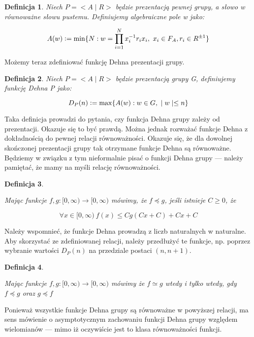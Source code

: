 \documentclass[licencjacka]{pracamgr}
\newcommand{\defeq}{\vcentcolon=}
\newtheorem{defi}{Definicja}[section]
\begin{document}
\begin{defi}\label{Algebraic area}
Niech $P = <A \mid R>$ będzie prezentacją pewnej grupy, a słowo w równoważne słowu pustemu. Definiujemy algebraiczne pole w jako:

\[ A(w) \defeq \min \{ N : w = \prod_{i=1}^{N} x_{i}^{-1}r_{i}x_{i}, \  x_{i} \in F_{A}, r_{i} \in R^{\pm 1} \} \]

\end{defi}

Możemy teraz zdefiniować funkcję Dehna prezentacji grupy.

\begin{defi}\label{Dehn function}
Niech $P = <A \mid R>$ będzie prezentacją grupy G, definiujemy funkcję Dehna P jako:

\[ D_{P}(n) \defeq \max \{ A(w) : w \in G, \ \mid w \mid \leq n \} \]

\end{defi}

Taka definicja prowadzi do pytania, czy funkcja Dehna grupy zależy od prezentacji. Okazuje się to być prawdą. Można jednak rozważać funkcje Dehna z dokładnością do pewnej relacji równoważności. Okazuje się, że dla dowolnej skończonej prezentacji grupy tak otrzymane funkcje Dehna są równoważne. Będziemy w związku z tym nieformalnie pisać o funkcji Dehna grupy — należy pamiętać, że mamy na myśli relację równoważności.

\begin{defi}\label{order relation}

Mając funkcje $f, g : [0, \infty) \rightarrow [0, \infty) $ mówimy, że $f \preceq g$, jeśli istnieje $C \ge 0$, że

\[ \forall x \in [0, \infty) \  f(x) \leq C g(Cx+C) + Cx + C  \]

\end{defi}

Należy wspomnieć, że funkcje Dehna prowadzą z liczb naturalnych w naturalne. Aby skorzystać ze zdefiniowanej relacji, należy przedłużyć te funkcje, np. poprzez wybranie wartości $D_P(n)$ na przedziale postaci $(n,n +1)$.


\begin{defi}\label{equivalence relation}

Mając funkcje $f, g : [0, \infty) \rightarrow [0, \infty) $ mówimy że $f \simeq g$ wtedy i tylko wtedy, gdy $f \preceq g$ oraz $g \preceq f$

\end{defi}

Ponieważ wszystkie funkcje Dehna grupy są równoważne w powyższej relacji, ma sens mówienie o asymptotycznym zachowaniu funkcji Dehna grupy względem wielomianów — mimo iż oczywiście jest to klasa równoważności funkcji.
\end{document}
